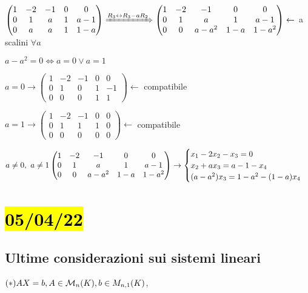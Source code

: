 \documentclass{article}
\begin{document}
       $\begin{pmatrix}
         1&-2&-1&0&0\\
         0&1&a&1&a-1\\
         0&a&a&1&1-a
       \end{pmatrix}\xRightarrow{R_3\leftrightarrow R_3-aR_2}
       \begin{pmatrix}
         1&-2&-1&0&0\\
         0&1&a&1&a-1\\
         0&0&a-a^2&1-a&1-a^2
       \end{pmatrix}\leftarrow$ a scalini $\forall a$

       $a-a^2=0\Leftrightarrow a=0\vee a=1$

       $a=0\rightarrow
       \begin{pmatrix}
         1&-2&-1&0&0\\
         0&1&0&1&-1\\
         0&0&0&1&1
       \end{pmatrix}\leftarrow$ compatibile

       $a=1\rightarrow
       \begin{pmatrix}
         1&-2&-1&0&0\\
         0&1&1&1&0\\
         0&0&0&0&0
       \end{pmatrix}\leftarrow$ compatibile

       $a\not=0,\ a\not=1\\
       \begin{pmatrix}
        1&-2&-1&0&0\\
        0&1&a&1&a-1\\
        0&0&a-a^2&1-a&1-a^2
       \end{pmatrix}\rightarrow
       \begin{cases}
        x_1-2x_2-x_3=0\\
        x_2+ax_3=a-1-x_4\\
        (a-a^2)x_3=1-a^2-(1-a)x_4
       \end{cases}$

\section{\hl{05/04/22}}
\subsection*{Ultime considerazioni sui sistemi lineari}
$(*)AX=b,A\in \mathcal{M}_n(K),b\in M_{n,1}(K)$,
\end{document}
